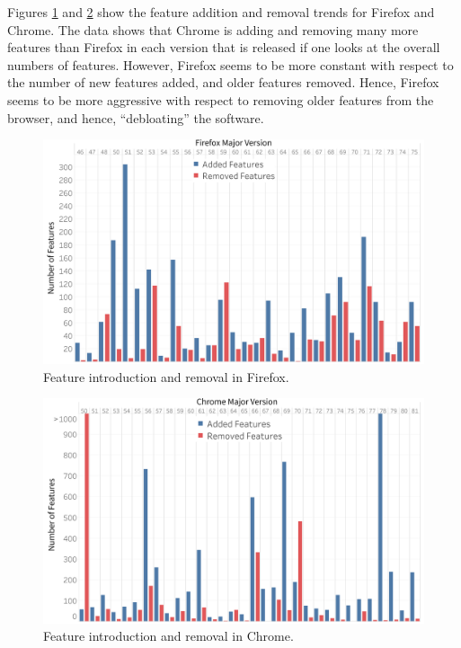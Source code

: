   Figures \ref{fig:ffaddremove} and \ref{fig:chaddremove} show the
  feature addition and removal trends for Firefox and Chrome. The data
  shows that Chrome is adding and removing many more features than
  Firefox in each version that is released if one looks at the overall
  numbers of features. However, Firefox seems to be more constant with
  respect to the number of new features added, and older features
  removed. Hence, Firefox seems to be more aggressive with respect to
  removing older features from the browser, and hence, ``debloating''
  the software.

\begin{figure}[ht]
    \centering
    \includegraphics[width=\columnwidth]{figures/Firefox-add-remove.png}
    \caption{Feature introduction and removal in Firefox.}
    \label{fig:ffaddremove}
\end{figure}

\begin{figure}[ht]
    \centering
    \includegraphics[width=\columnwidth]{figures/Chrome-add-remove.png}
    \caption{Feature introduction and removal in Chrome.}
    \label{fig:chaddremove}
\end{figure}

